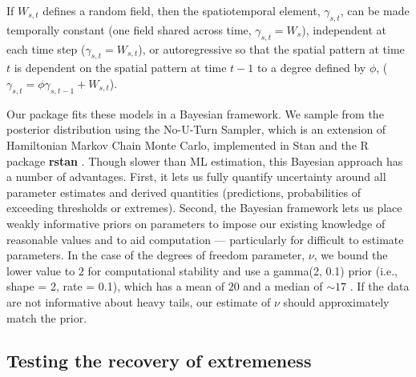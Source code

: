 \documentclass[12pt,english]{article}
\begin{document}
\begin{spacing}{1.9}
If $W_{s,t}$ defines a random field, then the spatiotemporal element,
$\gamma_{s,t}$, can be made temporally constant (one field shared across time,
$\gamma_{s,t} = W_{s}$), independent at each time step ($\gamma_{s,t} =
W_{s,t}$), or autoregressive so that the spatial pattern at time $t$ is
dependent on the spatial pattern at time $t-1$ to a degree defined by $\phi$,
($\gamma_{s,t} = \phi \gamma_{s,t-1} + W_{s,t}$).

Our package fits these models in a Bayesian framework. We sample
from the posterior distribution using the No-U-Turn Sampler, which is an
extension of Hamiltonian Markov Chain Monte Carlo, implemented in Stan 
\citep{standevelopmentteam2016a, carpenter2017}
and the R package \textbf{rstan} \citep{standevelopmentteam2016}. Though slower
than ML estimation, this Bayesian approach has a
number of advantages. First, it lets us fully quantify
uncertainty around all parameter estimates and derived quantities (predictions, 
probabilities of exceeding thresholds or extremes). Second, the Bayesian framework 
lets us place weakly informative priors on parameters to impose our existing 
knowledge of reasonable values and to aid computation --- particularly for
difficult to estimate
parameters. In the case of
the degrees of freedom parameter, $\nu$, we bound the lower value to $2$ for
computational stability and use a gamma(2, 0.1) prior (i.e., shape = 2, rate = 0.1),
which has a mean of $20$ and a median of $\sim 17$ \citep{juarez2010}.
If the data are not informative about heavy
tails, our estimate of $\nu$ should approximately match the prior.

\subsection{Testing the recovery of extremeness}


\end{spacing}
\end{document}
